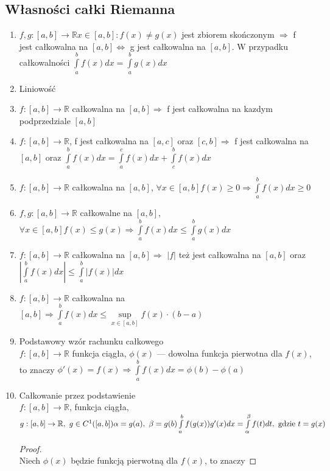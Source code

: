 \documentclass[12pt,a4paper]{article}
\theoremstyle{definition}
\begin{document}
\subsection{Własności całki Riemanna}

\begin{enumerate}
\item $f,g: [a,b] \to \mathbb{R} {x\in[a,b]: f(x) \neq g(x)}$ jest zbiorem skończonym $\Rightarrow$ f jest całkowalna na $[a,b]\Leftrightarrow$ g jest całkowalna na $[a,b]$. W przypadku całkowalności $\int\limits_a^bf(x)dx=\int\limits_a^bg(x)dx$
\item Liniowość
\item $f: [a,b]\to\mathbb{R}$ całkowalna na $[a,b] \Rightarrow$ f jest całkowalna na kazdym podprzedziale $[a,b]$
\item $f: [a,b]\to\mathbb{R}$, f jest całkowalna na $[a,c]$ oraz $[c,b] \Rightarrow$ f jest całkowalna na $[a,b]$ oraz $\int\limits_a^bf(x)dx = \int\limits_a^cf(x)dx + \int\limits_c^bf(x)dx$
\item $f: [a,b] \to \mathbb{R}$ całkowalna na $[a,b]$, $\forall x\in[a,b] f(x) \geq 0 \Rightarrow \int\limits_a^bf(x)dx \geq 0$
\item $f,g: [a,b] \to \mathbb{R}$ całkowalne na $[a,b]$, $\forall x\in[a,b] f(x) \leq g(x) \Rightarrow \int\limits_a^bf(x)dx \leq \int\limits_a^bg(x)dx$
\item $f: [a,b] \to \mathbb{R}$ całkowalna na $[a,b] \Rightarrow$ $|f|$ też jest całkowalna na $[a,b]$ oraz $|\int\limits_a^bf(x)dx| \leq \int\limits_a^b|f(x)|dx$
\item $f: [a,b] \to \mathbb{R}$ całkowalna na $[a,b] \Rightarrow \int\limits_a^bf(x)dx \leq \sup\limits_{x\in[a,b]}f(x)\cdot(b-a)$
\item Podstawowy wzór rachunku całkowego\\
$f: [a,b] \to \mathbb{R}$ funkcja ciągła, $\phi(x)$ --- dowolna funkcja pierwotna dla $f(x)$, to znaczy $\phi'(x)=f(x) \Rightarrow \int\limits_a^bf(x)dx = \phi(b)-\phi(a)$
\item Całkowanie przez podstawienie\\
$
f: [a,b]\to\mathbb{R}$, funkcja ciągła, $g: [a,b]\to\mathbb{R},~ g\in C^1([a,b])\\
\alpha = g(a),~ \beta =g(b)\\
\int\limits_a^bf(g(x))g'(x)dx = \int\limits_\alpha^\beta f(t)dt, \mbox{ gdzie }t = g(x)
$
\begin{proof}~\\
	Niech $\phi(x)$ będzie funkcją pierwotną dla $f(x)$, to znaczy

\end{proof}
\end{enumerate}
\end{document}

